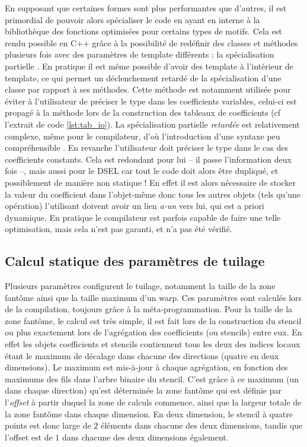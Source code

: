 En supposant que certaines formes sont plus performantes que d'autres, il est primordial de pouvoir alors spécialiser le code en ayant en interne à la bibliothèque des fonctions optimisées pour certains types de motifs. Cela est rendu possible en \textsf{C++} grâce à la possibilité de redéfinir des classes et méthodes plusieurs fois avec des paramètres de template différents : la spécialisation partielle \cite{Web1}. En pratique il est même possible d'avoir des template à l'intérieur de template, ce qui permet un déclenchement retardé de la spécialisation d'une classe par rapport à ses méthodes. Cette méthode est notamment utilisée pour éviter à l'utilisateur de préciser le type dans les coefficients variables, celui-ci est propagé à la méthode lors de la construction des tableaux de coefficients (cf l'extrait de code \ref{lst:tab_io}). La spécialisation partielle \emph{retardée} est relativement complexe, même pour le compilateur, d'où l'introduction d'une syntaxe peu compréhensible \cite{Web2}. En revanche l'utilisateur doit préciser le type dans le cas des coefficients constants. Cela est redondant pour lui -- il passe l'information deux fois --, mais aussi pour le DSEL car tout le code doit alors être dupliqué, et possiblement de manière non statique ! En effet il est alors nécessaire de stocker la valeur du coefficient dans l'objet-même donc tous les autres objets (tels qu'une opération) l'utilisant doivent avoir un lien \emph{a-un} vers lui, qui est a priori dynamique. En pratique le compilateur est parfois capable de faire une telle optimisation, mais cela n'est pas garanti, et n'a pas été vérifié.


\subsection{Calcul statique des paramètres de tuilage}
\label{sec:param_tuile}

Plusieurs paramètres configurent le tuilage, notamment la taille de la zone fantôme ainsi que la taille maximum d'un warp. Ces paramètres sont calculés lors de la compilation, toujours grâce à la méta-programmation. Pour la taille de la zone fantôme, le calcul est très simple, il est fait lors de la construction du stencil ou plus exactement lors de l'agrégation des coefficients (ou stencils) entre eux. En effet les objets coefficients et stencils contiennent tous les deux des indices locaux étant le maximum de décalage dans chacune des directions (quatre en deux dimensions). Le maximum est mis-à-jour à chaque agrégation, en fonction des maximums des fils dans l'arbre binaire du stencil. C'est grâce à ce maximum (un dans chaque direction) qu'est déterminée la zone fantôme qui est définie par l'\emph{offset} à partir duquel la zone de calculs commence, ainsi que la largeur totale de la zone fantôme dans chaque dimension. En deux dimension, le stencil à quatre points est donc large de $2$ éléments dans chacune des deux dimensions, tandis que l'offset est de $1$ dans chacune des deux dimensions également.

